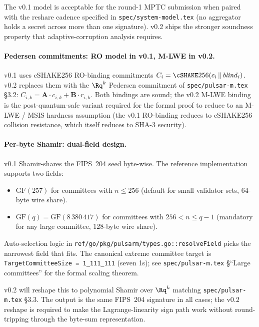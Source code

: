 The v0.1 model is acceptable for the round-1 MPTC submission when
paired with the reshare cadence specified in
\texttt{spec/system-model.tex} (no aggregator holds a secret across
more than one signature). v0.2 ships the stronger soundness property
that adaptive-corruption analysis requires.

\paragraph{Pedersen commitments: RO model in v0.1, M-LWE in v0.2.}
v0.1 uses cSHAKE256 RO-binding commitments
$C_i = \cSHAKE256(c_i \,\Vert\, \mathit{blind}_i)$. v0.2 replaces
them with the $\Rq^k$ Pedersen commitment of
\texttt{spec/pulsar-m.tex} \S3.2:
$C_{i,k} = \mathbf{A} \cdot c_{i,k} + \mathbf{B} \cdot r_{i,k}$. Both
bindings are sound; the v0.2 M-LWE binding is the post-quantum-safe
variant required for the formal proof to reduce to an M-LWE / MSIS
hardness assumption (the v0.1 RO-binding reduces to cSHAKE256
collision resistance, which itself reduces to SHA-3 security).

\paragraph{Per-byte Shamir: dual-field design.}
v0.1 Shamir-shares the FIPS~204 seed byte-wise. The reference
implementation supports two fields:

\begin{itemize}[leftmargin=*, itemsep=0pt]
\item $\mathrm{GF}(257)$ for committees with $n \le 256$ (default
for small validator sets, 64-byte wire share).
\item $\mathrm{GF}(q) = \mathrm{GF}(8\,380\,417)$ for committees with
$256 < n \le q - 1$ (mandatory for any large committee, 128-byte
wire share).
\end{itemize}

Auto-selection logic in
\texttt{ref/go/pkg/pulsarm/types.go::resolveField} picks the
narrowest field that fits. The canonical extreme committee target is
\texttt{TargetCommitteeSize = 1\_111\_111} (seven 1s); see
\texttt{spec/pulsar-m.tex} \S``Large committees'' for the formal
scaling theorem.

v0.2 will reshape this to polynomial Shamir over $\Rq^k$ matching
\texttt{spec/pulsar-m.tex} \S3.3. The output is the same FIPS~204
signature in all cases; the v0.2 reshape is required to make the
Lagrange-linearity sign path work without round-tripping through the
byte-sum representation.

